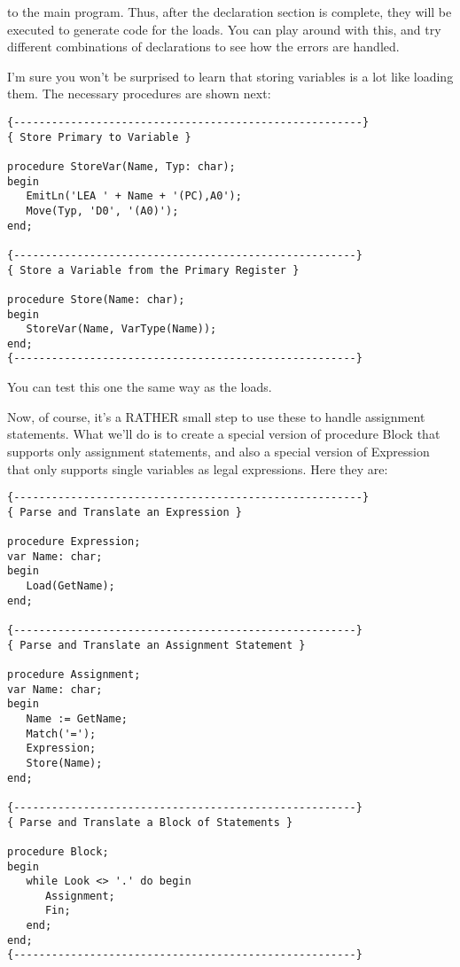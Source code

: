 to  the main program. Thus, after  the  declaration  section  is complete, they will be executed to generate code  for  the loads. You can play around with  this, and try different combinations of declarations to see how the errors are handled.

I'm sure you won't be surprised to learn  that  storing variables is a lot like  loading  them. The necessary procedures are shown next:

\begin{verbatim}
{-------------------------------------------------------}
{ Store Primary to Variable }

procedure StoreVar(Name, Typ: char);
begin
   EmitLn('LEA ' + Name + '(PC),A0');
   Move(Typ, 'D0', '(A0)');
end;

{------------------------------------------------------}
{ Store a Variable from the Primary Register }

procedure Store(Name: char);
begin
   StoreVar(Name, VarType(Name));
end;
{------------------------------------------------------}
\end{verbatim}

You can test this one the same way as the loads.

Now, of course, it's a RATHER  small  step to use these to handle assignment  statements. What we'll do is  to  create  a  special version   of  procedure  Block  that  supports  only   assignment statements, and also a  special  version  of Expression that only supports single variables as legal expressions. Here they are:

\begin{verbatim}
{-------------------------------------------------------}
{ Parse and Translate an Expression }

procedure Expression;
var Name: char;
begin
   Load(GetName);
end;

{------------------------------------------------------}
{ Parse and Translate an Assignment Statement }

procedure Assignment;
var Name: char;
begin
   Name := GetName;
   Match('=');
   Expression;
   Store(Name);
end;

{------------------------------------------------------}
{ Parse and Translate a Block of Statements }

procedure Block;
begin
   while Look <> '.' do begin
      Assignment;
      Fin;
   end;
end;
{------------------------------------------------------}
\end{verbatim}

